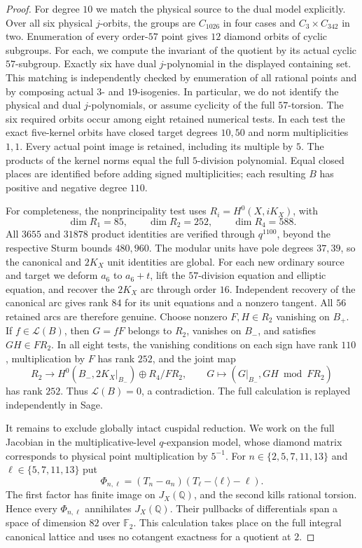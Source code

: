 \begin{proof}
For degree $10$ we match the physical source to the dual model
explicitly. Over all six physical $j$-orbits, the groups are
$C_{1026}$ in four cases and $C_3\times C_{342}$ in two.
Enumeration of every order-$57$ point gives $12$ diamond orbits
of cyclic subgroups. For each, we compute the invariant of the
quotient by its actual cyclic $57$-subgroup. Exactly six have
dual $j$-polynomial in the displayed containing set. This
matching is independently checked by enumeration of all rational
points and by composing actual $3$- and $19$-isogenies.
In particular, we do not identify the physical and dual
$j$-polynomials, or assume cyclicity of the full $57$-torsion.
The six required orbits occur among eight retained numerical
tests. In each test the exact five-kernel orbits have closed
target degrees $10,50$ and norm multiplicities $1,1$.
Every actual point image is retained, including its multiple by
$5$. The products of the kernel norms equal the full
$5$-division polynomial. Equal closed places are identified
before adding signed multiplicities; each resulting $B$ has
positive and negative degree $110$.

For completeness, the nonprincipality test uses
$R_i=H^0(X,iK_X)$, with
\[
 \dim R_1=85,\qquad \dim R_2=252,\qquad \dim R_4=588.
\]
All $3655$ and $31878$ product identities are verified through
$q^{1100}$, beyond the respective Sturm bounds $480,960$.
The modular units have pole degrees $37,39$, so the canonical
and $2K_X$ unit identities are global. For each new ordinary
source and target we deform $a_6$ to $a_6+t$, lift the
$57$-division equation and elliptic equation, and recover the
$2K_X$ arc through order $16$. Independent recovery of the
canonical arc gives rank $84$ for its unit equations and a
nonzero tangent. All $56$ retained arcs are therefore genuine.
Choose nonzero $F,H\in R_2$ vanishing on $B_+$. If
$f\in\mathcal L(B)$, then $G=fF$ belongs to $R_2$, vanishes on
$B_-$, and satisfies $GH\in FR_2$. In all eight tests, the
vanishing conditions on each sign have rank $110$,
multiplication by $F$ has rank $252$, and the joint map
\[
 R_2\longrightarrow
 H^0(B_-,2K_X|_{B_-})\oplus R_4/FR_2,
 \qquad G\longmapsto(G|_{B_-},GH\bmod FR_2)
\]
has rank $252$. Thus $\mathcal L(B)=0$, a contradiction.
The full calculation is replayed independently in Sage.

It remains to exclude globally intact cuspidal reduction.
We work on the full Jacobian in the multiplicative-level
$q$-expansion model, whose diamond matrix corresponds to physical
point multiplication by $5^{-1}$. For
$n\in\{2,5,7,11,13\}$ and $\ell\in\{5,7,11,13\}$ put
\[
 \Phi_{n,\ell}=(T_n-a_n)
                    (T_\ell-\langle\ell\rangle-\ell).
\]
The first factor has finite image on $J_X(\mathbb Q)$, and
the second kills rational torsion. Hence every $\Phi_{n,\ell}$
annihilates $J_X(\mathbb Q)$. Their pullbacks of differentials
span a space of dimension $82$ over $\mathbb F_2$.
This calculation takes place on the full integral canonical
lattice and uses no cotangent exactness for a quotient at $2$.


\end{proof}

